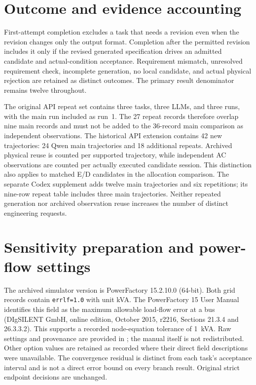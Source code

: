 \section{Outcome and evidence accounting}
\label{app:accounting}

First-attempt completion excludes a task that needs a revision even when the revision changes only the output format. Completion after the permitted revision includes it only if the revised generated specification drives an admitted candidate and actual-condition acceptance. Requirement mismatch, unresolved requirement check, incomplete generation, no local candidate, and actual physical rejection are retained as distinct outcomes. The primary result denominator remains twelve throughout.

The original API repeat set contains three tasks, three LLMs, and three runs, with the main run included as run~1. The 27 repeat records therefore overlap nine main records and must not be added to the 36-record main comparison as independent observations. The historical API extension contains 42 new trajectories: 24 Qwen main trajectories and 18 additional repeats. Archived physical reuse is counted per supported trajectory, while independent AC observations are counted per actually executed candidate session. This distinction also applies to matched E/D candidates in the allocation comparison. The separate Codex supplement adds twelve main trajectories and six repetitions; its nine-row repeat table includes three main trajectories. Neither repeated generation nor archived observation reuse increases the number of distinct engineering requests.


\section{Sensitivity preparation and power-flow settings}
\label{app:settings}


The archived simulator version is PowerFactory 15.2.10.0 (64-bit). Both grid records contain \texttt{errlf=1.0} with unit kVA. The PowerFactory 15 User Manual identifies this field as the maximum allowable load-flow error at a bus (DIgSILENT GmbH, online edition, October 2015, r2216, Sections 21.3.4 and 26.3.3.2). This supports a recorded node-equation tolerance of 1~kVA. Raw settings and provenance are provided in ; the manual itself is not redistributed. Other option values are retained as recorded where their direct field descriptions were unavailable. The convergence residual is distinct from each task's acceptance interval and is not a direct error bound on every branch result. Original strict endpoint decisions are unchanged.

